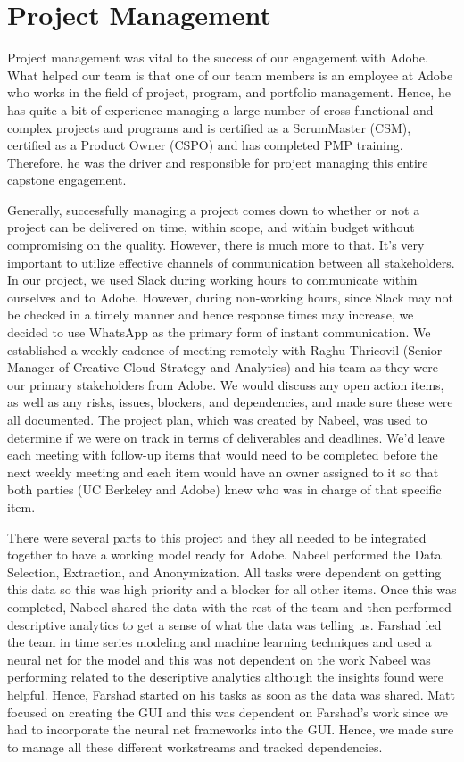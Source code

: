 \documentclass[11pt, oneside, authoryear]{report}
\begin{document}
\section{Project Management}
Project management was vital to the success of our engagement with Adobe. What helped our team is that one of our team members is an employee at Adobe who works in the field of project, program, and portfolio management. Hence, he has quite a bit of experience managing a large number of cross-functional and complex projects and programs and is certified as a ScrumMaster (CSM), certified as a Product Owner (CSPO) and has completed PMP training. Therefore, he was the driver and responsible for project managing this entire capstone engagement.

Generally, successfully managing a project comes down to whether or not a project can be delivered on time, within scope, and within budget without compromising on the quality. However, there is much more to that. It's very important to utilize effective channels of communication between all stakeholders. In our project, we used Slack during working hours to communicate within ourselves and to Adobe. However, during non-working hours, since Slack may not be checked in a timely manner and hence response times may increase, we decided to use WhatsApp as the primary form of instant communication. We established a weekly cadence of meeting remotely with Raghu Thricovil (Senior Manager of Creative Cloud Strategy and Analytics) and his team as they were our primary stakeholders from Adobe. We would discuss any open action items, as well as any risks, issues, blockers, and dependencies, and made sure these were all documented. The project plan, which was created by Nabeel, was used to determine if we were on track in terms of deliverables and deadlines. We'd leave each meeting with follow-up items that would need to be completed before the next weekly meeting and each item would have an owner assigned to it so that both parties (UC Berkeley and Adobe) knew who was in charge of that specific item.

There were several parts to this project and they all needed to be integrated together to have a working model ready for Adobe. Nabeel performed the Data Selection, Extraction, and Anonymization. All tasks were dependent on getting this data so this was high priority and a blocker for all other items. Once this was completed, Nabeel shared the data with the rest of the team and then performed descriptive analytics to get a sense of what the data was telling us. Farshad led the team in time series modeling and machine learning techniques and used a neural net for the model and this was not dependent on the work Nabeel was performing related to the descriptive analytics although the insights found were helpful. Hence, Farshad started on his tasks as soon as the data was shared. Matt focused on creating the GUI and this was dependent on Farshad's work since we had to incorporate the neural net frameworks into the GUI. Hence, we made sure to manage all these different workstreams and tracked dependencies.
\end{document}
